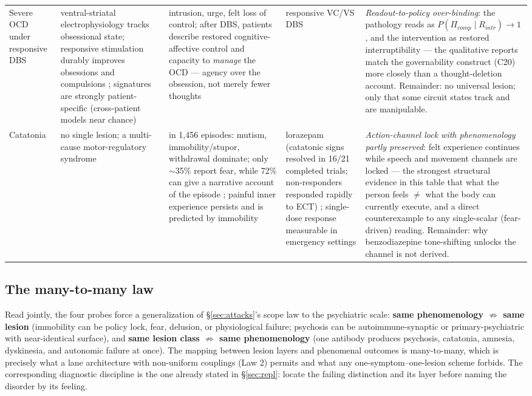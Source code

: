 \documentclass[9pt,twocolumn]{article}
\begin{document}
\begin{table}[!t]
\begin{tabularx}{\textwidth}{p{}p{}p{}p{}X}
Severe OCD under responsive DBS & ventral-striatal electrophysiology tracks obsessional state; responsive stimulation durably improves obsessions and compulsions \cite{provenza2024}; signatures are strongly patient-specific (cross-patient models near chance) \cite{fridgeirsson2023} & intrusion, urge, felt loss of control; after DBS, patients describe restored cognitive-affective control and capacity to \emph{manage} the OCD --- agency over the obsession, not merely fewer thoughts \cite{bosanac2023} & responsive VC/VS DBS & \emph{Readout-to-policy over-binding}: the pathology reads as $P(\Pi_{comp}\mid R_{intr})\to1$, and the intervention as restored interruptibility --- the qualitative reports match the governability construct (C20) more closely than a thought-deletion account. Remainder: no universal lesion; only that some circuit states track and are manipulable. \\
Catatonia & no single lesion; a multi-cause motor-regulatory syndrome & in 1,456 episodes: mutism, immobility/stupor, withdrawal dominate; only $\sim$35\% report fear, while 72\% can give a narrative account of the episode \cite{dawkins2022}; painful inner experience persists and is predicted by immobility \cite{subjcat2026,northoff1996} & lorazepam (catatonic signs resolved in 16/21 completed trials; non-responders responded rapidly to ECT) \cite{ungvari1996}; single-dose response measurable in emergency settings \cite{lorchallenge2021} & \emph{Action-channel lock with phenomenology partly preserved}: felt experience continues while speech and movement channels are locked --- the strongest structural evidence in this table that what the person feels $\neq$ what the body can currently execute, and a direct counterexample to any single-scalar (fear-driven) reading. Remainder: why benzodiazepine tone-shifting unlocks the channel is not derived. \\
\bottomrule
\end{tabularx}
\end{table}

\subsection{The many-to-many law}
Read jointly, the four probes force a generalization of \S\ref{sec:attacks}'s scope law to the psychiatric scale: \textbf{same phenomenology $\not\Rightarrow$ same lesion} (immobility can be policy lock, fear, delusion, or physiological failure; psychosis can be autoimmune-synaptic or primary-psychiatric with near-identical surface), and \textbf{same lesion class $\not\Rightarrow$ same phenomenology} (one antibody produces psychosis, catatonia, amnesia, dyskinesia, and autonomic failure at once). The mapping between lesion layers and phenomenal outcomes is many-to-many, which is precisely what a lane architecture with non-uniform couplings (Law 2) permits and what any one-symptom--one-lesion scheme forbids. The corresponding diagnostic discipline is the one already stated in \S\ref{sec:repl}: locate the failing distinction and its layer before naming the disorder by its feeling.
\end{document}
